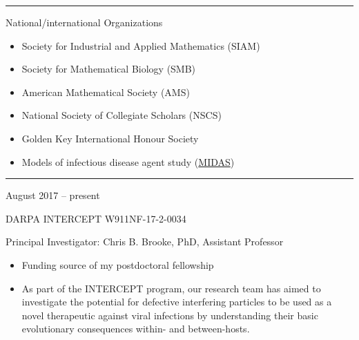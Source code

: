 \documentclass[a4paper,10pt]{article}
\newlength{\cvcolumngapwidth}
\newlength{\cvleftcolumnwidth}
\newlength{\cvrightcolumnwidth}
\newcommand{\cvsectionstyle}[1]{{\normalsize\cvsectionfont\textcolor{cvsectioncolor}{#1}}}
\newcommand{\cvtitlestyle}[1]{{\large\cvtitlefont\textcolor{cvtitlecolor}{#1}}}
\newcommand{\cvheadingstyle}[1]{{\normalsize\cvheadingfont\textcolor{cvheadingcolor}{#1}}}
\newlength{\cvafteritemskipamount}
\newlength{\cvaftersectionskipamount}
\newlength{\cvbetweensectionandheadingextraskipamount}
\newlength{\cvaftertitleskipamount}
\newlength{\cvparskip}
\newcommand{\cvsection}[1]{
    \begin{minipage}[t]{\cvleftcolumnwidth}
        \raggedleft\cvsectionstyle{#1}
    \end{minipage}%
    \hspace{\cvcolumngapwidth}%
    \begin{minipage}[t]{\cvrightcolumnwidth}
        \textcolor{cvrulecolor}{\rule{\cvrightcolumnwidth}{0.3mm}}
    \end{minipage}

    \vspace{\cvaftersectionskipamount}
}
\newcommand{\cvitem}[2]{
    \begin{minipage}[t]{\cvleftcolumnwidth}
        \raggedleft #1
    \end{minipage}%
    \hspace{\cvcolumngapwidth}%
    \begin{minipage}[t]{\cvrightcolumnwidth}
        \setlength{\parskip}{\cvparskip} #2
    \end{minipage}

    \vspace{\cvafteritemskipamount}
}
\newcommand{\cvtitle}[1]{
    \cvtitlestyle{#1}

    \vspace{\cvaftertitleskipamount}
    \vspace{-\cvparskip}
}
\begin{document}
\newpage
\cvsection{CURRENT PROFESSIONAL MEMBERSHIPS}

\cvitem{
    \cvheadingstyle{}
}{
    \cvtitle{National/international Organizations}
    \begin{itemize}[leftmargin=*]
        \item Society for Industrial and Applied Mathematics (SIAM) 
    	\item Society for Mathematical Biology (SMB)
        \item American Mathematical Society (AMS)
        \item National Society of Collegiate Scholars (NSCS)
        \item Golden Key International Honour Society
        \item Models of infectious disease agent study (\href{https://midasnetwork.us/}{MIDAS})
    \end{itemize}
    
}


%
%


\cvsection{FUNDING ACKNOWLEDGMENTS}
\vspace{\cvbetweensectionandheadingextraskipamount}

\cvitem{
    \cvheadingstyle{August 2017 -- present}
}{
    \cvtitle{DARPA INTERCEPT W911NF-17-2-0034} 
    Principal Investigator: Chris B. Brooke, PhD, Assistant Professor
    \begin{itemize}
	\item Funding source of my postdoctoral fellowship
    	\item As part of the INTERCEPT program, our research team has aimed to investigate the potential for defective interfering particles to be used as a novel therapeutic against viral infections by understanding their basic evolutionary consequences within- and between-hosts.
    \end{itemize}
    
}
\end{document}
